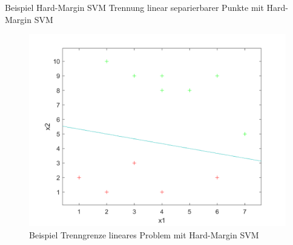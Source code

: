 \documentclass[ngerman]{beamer}
\begin{document}
\begin{frame}{Beispiel Hard-Margin SVM}
    Trennung linear separierbarer Punkte mit Hard-Margin SVM \\ \pause
    \begin{center}
        \begin{figure}
            \includegraphics[width=\textwidth,height=0.7\textheight,keepaspectratio]{../code/octave/images/svmsimple}
            \caption{Beispiel Trenngrenze lineares Problem mit Hard-Margin SVM}
            \label{fig:bsphmsvm}
        \end{figure}
    \end{center}
\end{frame}
\end{document}
